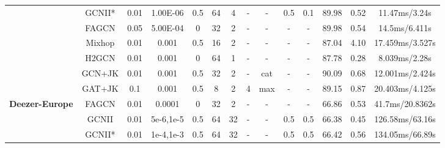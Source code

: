 \documentclass{article}
\newcommand{\0}{{\boldsymbol{0}}}
\newcommand{\6}{{\partial}}
\newcommand{\8}{{\infty}}
\newcommand{\4}{{\nabla}}
\begin{document}
\begin{table}[htbp]
{\begin{tabular}{c|c|cccccccccccc}
          & GCNII* & 0.01  & 1.00E-06 & 0.5   & 64    & 4     & -     & -     & 0.5   & 0.1   & 89.98 & 0.52  & 11.47ms/3.24s \\
          & FAGCN & 0.05  & 5.00E-04 & 0     & 32    & 2     & -     & -     & -     & -     & 89.98 & 0.54  & 14.5ms/6.411s \\
          &  Mixhop & 0.01  & 0.001 & 0.5   & 16    & 2     & - & - & - & - & 87.04 & 4.10  & {17.459ms/3.527s} \\
          & H2GCN & 0.01  & 0.001 & 0     & 64    & 1     & - & - & - & - & 87.78 & 0.28  & {8.039ms/2.28s} \\
          & GCN+JK & 0.01  & 0.001 & 0.5   & 32    & 2     & - & {cat} & - & - & 90.09 & 0.68  & {12.001ms/2.424s} \\
          &  GAT+JK & 0.1   & 0.001 & 0.5   & 8     & 2     & 4     & {max} & - & - & 89.15 & 0.87  & {20.403ms/4.125s} \\
          \midrule
    \multirow{3}[1]{*}{\textbf{Deezer-Europe}} & FAGCN & 0.01  & 0.0001 & 0     & 32    & 2     & -     & -     & -     & -     & 66.86 & 0.53  & {41.7ms/20.8362s} \\
          & GCNII & 0.01  & 5e-6,1e-5 & 0.5   & 64    & 32    & -     & -     & 0.5   & 0.5   & 66.38 & 0.45  & 126.58ms/63.16s \\
          & GCNII* & 0.01  & 1e-4,1e-3 & 0.5   & 64    & 32    & -     & -     & 0.5   & 0.5   & 66.42 & 0.56  & 134.05ms/66.89s \\
    \bottomrule
    \bottomrule
    \end{tabular}\label{tab:hyperparameters_baselines}}
\end{table} 
\end{document}
